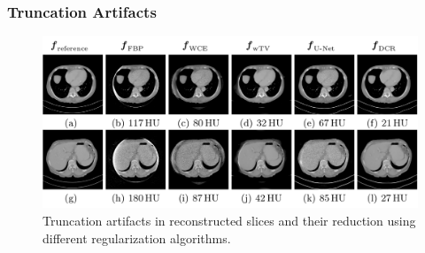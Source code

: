 \begin{frame}
	\frametitle{Truncation Artifacts}

	\begin{figure}[tbp]
		\centering
		\includegraphics[width=0.8\linewidth]{images/truncation_yixing.png}
		\caption{Truncation artifacts in reconstructed slices and their reduction using different regularization algorithms.}%
		\label{fig:ct_truncation}
	\end{figure}
	\flushright{}
	\tiny


\end{frame}


